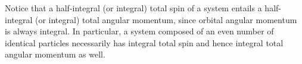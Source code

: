 Notice that a half-integral (or integral) total spin of a system entails a
half-integral (or integral) total angular momentum, since orbital angular
momentum is always integral. In particular, a system composed of an even
number of identical particles necessarily has integral total spin and hence
integral total angular momentum as well.
